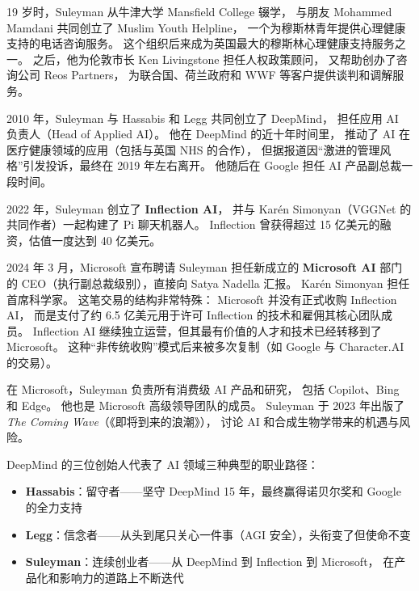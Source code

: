 19 岁时，Suleyman 从牛津大学 Mansfield College 辍学，
与朋友 Mohammed Mamdani 共同创立了 Muslim Youth Helpline，
一个为穆斯林青年提供心理健康支持的电话咨询服务。
这个组织后来成为英国最大的穆斯林心理健康支持服务之一。
之后，他为伦敦市长 Ken Livingstone 担任人权政策顾问，
又帮助创办了咨询公司 Reos Partners，
为联合国、荷兰政府和 WWF 等客户提供谈判和调解服务。

2010 年，Suleyman 与 Hassabis 和 Legg 共同创立了 DeepMind，
担任应用 AI 负责人（Head of Applied AI）。
他在 DeepMind 的近十年时间里，
推动了 AI 在医疗健康领域的应用（包括与英国 NHS 的合作），
但据报道因``激进的管理风格''引发投诉，最终在 2019 年左右离开。
他随后在 Google 担任 AI 产品副总裁一段时间。

2022 年，Suleyman 创立了 \textbf{Inflection AI}，
并与 Karén Simonyan（VGGNet 的共同作者）一起构建了 Pi 聊天机器人。
Inflection 曾获得超过 15 亿美元的融资，估值一度达到 40 亿美元。

\begin{whybox}
2024 年 3 月，Microsoft 宣布聘请 Suleyman 担任新成立的 \textbf{Microsoft AI} 部门的
CEO（执行副总裁级别），直接向 Satya Nadella 汇报。
Karén Simonyan 担任首席科学家。
这笔交易的结构非常特殊：
Microsoft 并没有正式收购 Inflection AI，
而是支付了约 6.5 亿美元用于许可 Inflection 的技术和雇佣其核心团队成员。
Inflection AI 继续独立运营，但其最有价值的人才和技术已经转移到了 Microsoft。
这种``非传统收购''模式后来被多次复制（如 Google 与 Character.AI 的交易）。
\end{whybox}

在 Microsoft，Suleyman 负责所有消费级 AI 产品和研究，
包括 Copilot、Bing 和 Edge。
他也是 Microsoft 高级领导团队的成员。
Suleyman 于 2023 年出版了 \textit{The Coming Wave}（《即将到来的浪潮》），
讨论 AI 和合成生物学带来的机遇与风险。

\begin{keybox}
DeepMind 的三位创始人代表了 AI 领域三种典型的职业路径：
\begin{itemize}[noitemsep]
  \item \textbf{Hassabis}：留守者——坚守 DeepMind 15 年，最终赢得诺贝尔奖和 Google 的全力支持
  \item \textbf{Legg}：信念者——从头到尾只关心一件事（AGI 安全），头衔变了但使命不变
  \item \textbf{Suleyman}：连续创业者——从 DeepMind 到 Inflection 到 Microsoft，
        在产品化和影响力的道路上不断迭代
\end{itemize}
\end{keybox}


